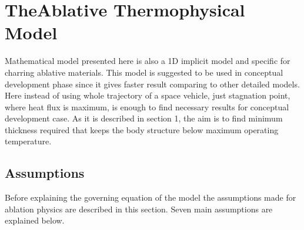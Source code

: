 \documentclass[a4paper, 12pt]{article} %
\begin{document}
\section{TheAblative Thermophysical Model}
Mathematical model presented here is also a 1D implicit model and specific for charring ablative materials. This model is suggested to be used in conceptual development phase since it gives faster result comparing to other detailed models. Here instead of using whole trajectory of a space vehicle, just stagnation point, where heat flux is maximum, is enough to find necessary results for conceptual development case. As it is described in section 1, the aim is to find minimum thickness required that keeps the body structure below maximum operating temperature.
\subsection{Assumptions}
Before explaining the governing equation of the model the assumptions made for ablation physics are described in this section. Seven main assumptions are explained below.
\end{document}
